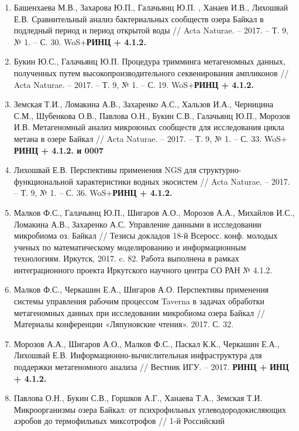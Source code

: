 \documentclass[a4paper,12pt,openany,final]{extreport}
\newcommand\theyear{2017}
\begin{document}
\endgroup

\appchapter{Публикации по теме проекта за \theyear{}~год}
\label{chap:publ}
\begin{enumerate}
\item
  Башенхаева М.В., Захарова Ю.П., Галачьянц Ю.П. , Ханаев И.В., Лихошвай
  Е.В. Сравнительный анализ бактериальных сообществ озера Байкал в
  подледный период и период открытой воды // Acta Naturae. -- 2017. --
  Т. 9, № 1. -- С. 30. WoS+\textbf{РИНЦ + 4.1.2.}
\item
  Букин Ю.С., Галачьянц Ю.П. Процедура тримминга метагеномных данных,
  полученных путем высокопроизводительного секвенирования ампликонов //
  Acta Naturae. -- 2017. -- Т. 9, № 1. -- С. 19. WoS+\textbf{РИНЦ +
  4.1.2.}
\item
  Земская Т.И., Ломакина А.В., Захаренко А.С., Хальзов И.А., Черницина
  С.М., Шубенкова О.В., Павлова О.Н., Букин С.В., Галачьянц Ю.П.,
  Морозов И.В. Метагеномный анализ микроюных сообществ для исследования
  цикла метана в озере Байкал // Acta Naturae. -- 2017. -- Т. 9, № 1. --
  С. 33. WoS+ \textbf{РИНЦ + 4.1.2. и 0007}
\item
  Лихошвай Е.В. Перспективы применения NGS для структурно-функциональной
  характеристики водных экосистем // Acta Naturae. -- 2017. -- Т. 9, №
  1. -- С. 36. WoS+\textbf{РИНЦ + 4.1.2.}
\item
  Малков Ф.С., Галачьянц Ю.П., Шигаров А.О., Морозов А.А., Михайлов
  И.С., Ломакина А.В., Захаренко А.С. Управление данными в исследовании
  микробиома оз. Байкал // Тезисы докладов 18-й Всеросс. конф. молодых
  ученых по математическому моделированию и информационным технологиям.
  Иркутск, 2017. c. 82. Работа выполнена в рамках интеграционного
  проекта Иркутского научного центра СО РАН № 4.1.2.
\item
  Малков Ф.С., Черкашин Е.А., Шигаров А.О. Перспективы применения
  системы управления рабочим процессом Taverna в задачах обработки
  метагеномных данных при исследовании микробиома озера Байкал //
  Материалы конференции «Ляпуновские чтения». 2017. С. 32.
\item
  Морозов А.А., Шигаров А.О., Малков Ф.С., Паскал К.К., Черкашин Е.А.,
  Лихошвай Е.В. Информационно-вычислительная инфраструктура для
  поддержки метагеномного анализа // Вестник ИГУ. -- 2017. \textbf{РИНЦ
  +} \textbf{ИНЦ + 4.1.2.}
\item
  Павлова О.Н., Букин С.В., Горшков А.Г., Ханаева Т.А., Земская Т.И.
  Микроорганизмы озера Байкал: от психрофильных углеводородокисляющих
  аэробов до термофильных миксотрофов // 1-й Российский

\end{enumerate}
\end{document}
